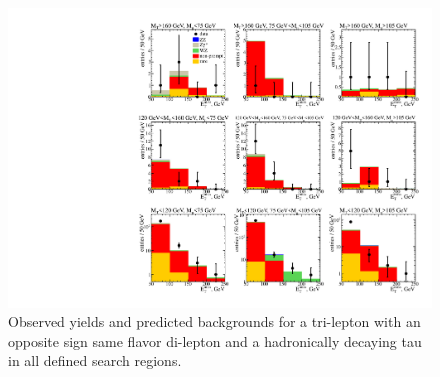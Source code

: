 \begin{figure}[htp]
\begin{center}
\includegraphics[width=1.0\textwidth]{plots/ossf1tau1.pdf}
\caption{Observed yields and predicted backgrounds for a tri-lepton with an opposite sign same flavor di-lepton 
and a hadronically decaying tau  in all defined search regions.}
\label{fig:OSSF1tau1}
\end{center}
\end{figure}

